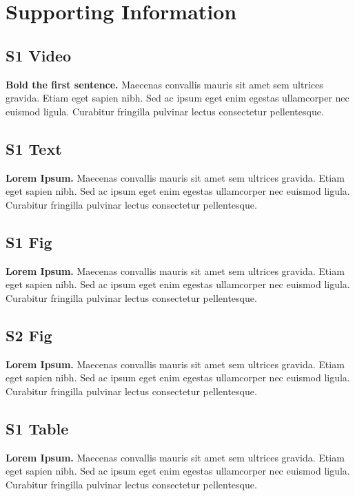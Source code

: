 \documentclass[10pt,letterpaper]{article}
\begin{document}
\section*{Supporting Information}

\subsection*{S1 Video}
\label{S1_Video}
{\bf Bold the first sentence.}  Maecenas convallis mauris sit amet sem ultrices gravida. Etiam eget sapien nibh. Sed ac ipsum eget enim egestas ullamcorper nec euismod ligula. Curabitur fringilla pulvinar lectus consectetur pellentesque.

\subsection*{S1 Text}
\label{S1_Text}
{\bf Lorem Ipsum.} Maecenas convallis mauris sit amet sem ultrices gravida. Etiam eget sapien nibh. Sed ac ipsum eget enim egestas ullamcorper nec euismod ligula. Curabitur fringilla pulvinar lectus consectetur pellentesque.

\subsection*{S1 Fig}
\label{S1_Fig}
{\bf Lorem Ipsum.} Maecenas convallis mauris sit amet sem ultrices gravida. Etiam eget sapien nibh. Sed ac ipsum eget enim egestas ullamcorper nec euismod ligula. Curabitur fringilla pulvinar lectus consectetur pellentesque.

\subsection*{S2 Fig}
\label{S2_Fig}
{\bf Lorem Ipsum.} Maecenas convallis mauris sit amet sem ultrices gravida. Etiam eget sapien nibh. Sed ac ipsum eget enim egestas ullamcorper nec euismod ligula. Curabitur fringilla pulvinar lectus consectetur pellentesque.

\subsection*{S1 Table}
\label{S1_Table}
{\bf Lorem Ipsum.} Maecenas convallis mauris sit amet sem ultrices gravida. Etiam eget sapien nibh. Sed ac ipsum eget enim egestas ullamcorper nec euismod ligula. Curabitur fringilla pulvinar lectus consectetur pellentesque.
\end{document}
